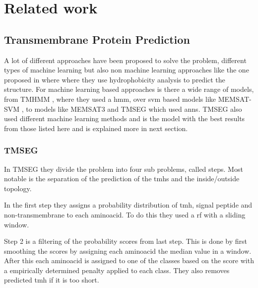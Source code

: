 \section{Related work}

\subsection{Transmembrane Protein Prediction}
% 

A lot of different approaches have been proposed to solve the problem, different types of machine 
learning but also non machine learning approaches like the one proposed in \cite{Heijne2} where 
where they use hydrophobicity analysis to predict the structure. For machine learning based 
approaches is there a wide range of models, from TMHMM \cite{tmhmm}, where they used a \gls{hmm},
over \gls{svm} based models like MEMSAT-SVM \cite{memsat-svm}, to models like MEMSAT3 \cite{memsat3}
and TMSEG \cite{tmseg} which used \glspl{ann}. TMSEG also used different machine learning methods 
and is the model with the best results from those listed here and is explained more in next section.

\subsubsection{TMSEG}
In TMSEG they divide the problem into four sub problems, called steps. 
Most notable is the separation of the prediction of the \glspl{tmh} and the inside/outside topology. 

In the first step they assigns a probability distribution of \gls{tmh}, signal peptide and non-transmembrane 
to each aminoacid. To do this they used a \gls{rf} with a sliding window. 

Step 2 is a filtering of the probability scores from last step. This is done by first smoothing the scores 
by assigning each aminoacid the median value in a window. After this each aminoacid is assigned to 
one of the classes based on the score with a empirically determined penalty applied to each class.
They also removes predicted \gls{tmh} if it is too short.

